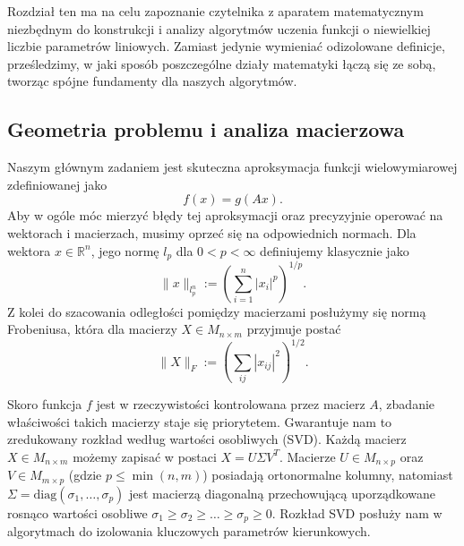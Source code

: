 Rozdział ten ma na celu zapoznanie czytelnika z aparatem matematycznym niezbędnym do konstrukcji i analizy algorytmów uczenia funkcji o niewielkiej liczbie parametrów liniowych. Zamiast jedynie wymieniać odizolowane definicje, prześledzimy, w jaki sposób poszczególne działy matematyki łączą się ze sobą, tworząc spójne fundamenty dla naszych algorytmów.

\subsection{Geometria problemu i analiza macierzowa}
Naszym głównym zadaniem jest skuteczna aproksymacja funkcji wielowymiarowej zdefiniowanej jako
$$f(x)=g(Ax).$$
Aby w ogóle móc mierzyć błędy tej aproksymacji oraz precyzyjnie operować na wektorach i macierzach, musimy oprzeć się na odpowiednich normach. Dla wektora $x \in \mathbb{R}^n$, jego normę $l_p$ dla $0<p<\infty$ definiujemy klasycznie jako $$\|x\|_{l_p^n} := (\sum_{i=1}^n |x_i|^p)^{1/p}.$$
Z kolei do szacowania odległości pomiędzy macierzami posłużymy się normą Frobeniusa, która dla macierzy $X \in M_{n \times m}$ przyjmuje postać
$$\|X\|_F := (\sum_{ij} |x_{ij}|^2)^{1/2}.$$

Skoro funkcja $f$ jest w rzeczywistości kontrolowana przez macierz $A$, zbadanie właściwości takich macierzy staje się priorytetem. Gwarantuje nam to zredukowany rozkład według wartości osobliwych (SVD). Każdą macierz $X \in M_{n \times m}$ możemy zapisać w postaci $X = U \Sigma V^T$. Macierze $U \in M_{n \times p}$ oraz $V \in M_{m \times p}$ (gdzie $p \le \min(n,m)$) posiadają ortonormalne kolumny, natomiast $\Sigma = \text{diag}(\sigma_1, \dots, \sigma_p)$ jest macierzą diagonalną przechowującą uporządkowane rosnąco wartości osobliwe $\sigma_1 \ge \sigma_2 \ge \dots \ge \sigma_p \ge 0$. Rozkład SVD posłuży nam w algorytmach do izolowania kluczowych parametrów kierunkowych.
